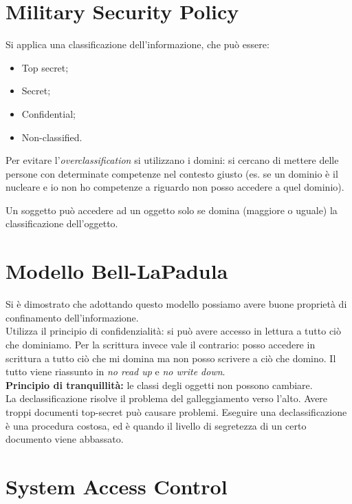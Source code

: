\section{Military Security Policy}

Si applica una classificazione dell'informazione, che può essere:
\begin{itemize}
 \item Top secret;
 \item Secret;
 \item Confidential;
 \item Non-classified.
\end{itemize}

Per evitare l'\textit{overclassification} si utilizzano i domini: si cercano
di mettere delle persone con determinate competenze nel contesto giusto (es.
se un dominio è il nucleare e io non ho competenze a riguardo non posso
accedere a quel dominio).

Un soggetto può accedere ad un oggetto solo se domina (maggiore o uguale) la
classificazione dell'oggetto.

\section{Modello Bell-LaPadula}

Si è dimostrato che adottando questo modello possiamo avere buone proprietà di
confinamento dell'informazione.\\
Utilizza il principio di confidenzialità: si può avere accesso in lettura a
tutto ciò che dominiamo. Per la scrittura invece vale il contrario: posso
accedere in scrittura a tutto ciò che mi domina ma non posso scrivere a ciò che
domino. Il tutto viene riassunto in \textit{no read up} e \textit{no write
down}.\\
\newline
\textbf{Principio di tranquillità:} le classi degli oggetti non possono
cambiare.\\
\newline
La declassificazione risolve il problema del galleggiamento verso l'alto. Avere
troppi documenti top-secret può causare problemi. Eseguire una
declassificazione è una procedura costosa, ed è quando il livello di segretezza
di un certo documento viene abbassato.

\section{System Access Control}


